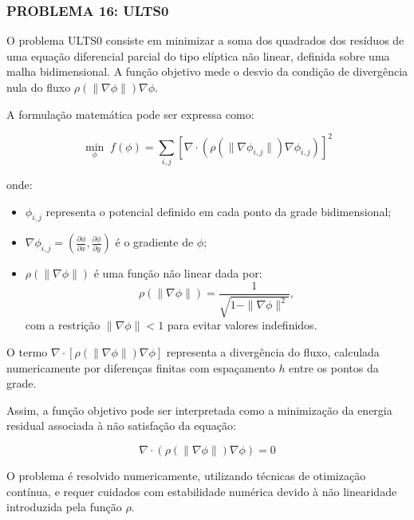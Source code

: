 \documentclass[12pt,a4paper]{article}
\begin{document}
\subsubsection{\textbf{PROBLEMA 16: ULTS0}}

O problema ULTS0 consiste em minimizar a soma dos quadrados dos resíduos de uma equação diferencial parcial do tipo elíptica não linear, definida sobre uma malha bidimensional. A função objetivo mede o desvio da condição de divergência nula do fluxo $\rho(\|\nabla \phi\|) \nabla \phi$.

A formulação matemática pode ser expressa como:

\begin{equation}
    \min_{\phi} \; f(\phi) = \sum_{i,j} \left[ \nabla \cdot \left( \rho(\|\nabla \phi_{i,j}\|) \nabla \phi_{i,j} \right) \right]^2
\end{equation}

onde:
\begin{itemize}
    \item $\phi_{i,j}$ representa o potencial definido em cada ponto da grade bidimensional;
    \item $\nabla \phi_{i,j} = \left( \frac{\partial \phi}{\partial x}, \frac{\partial \phi}{\partial y} \right)$ é o gradiente de $\phi$;
    \item $\rho(\|\nabla \phi\|)$ é uma função não linear dada por:
    \begin{equation}
        \rho(\|\nabla \phi\|) = \frac{1}{\sqrt{1 - \|\nabla \phi\|^2}},
    \end{equation}
    com a restrição $\|\nabla \phi\| < 1$ para evitar valores indefinidos.
\end{itemize}

O termo $\nabla \cdot [\rho(\|\nabla \phi\|) \nabla \phi]$ representa a divergência do fluxo, calculada numericamente por diferenças finitas com espaçamento $h$ entre os pontos da grade.  

Assim, a função objetivo pode ser interpretada como a minimização da energia residual associada à não satisfação da equação:

\begin{equation}
    \nabla \cdot \left( \rho(\|\nabla \phi\|) \nabla \phi \right) = 0
\end{equation}

O problema é resolvido numericamente, utilizando técnicas de otimização contínua, e requer cuidados com estabilidade numérica devido à não linearidade introduzida pela função $\rho$.
\end{document}

